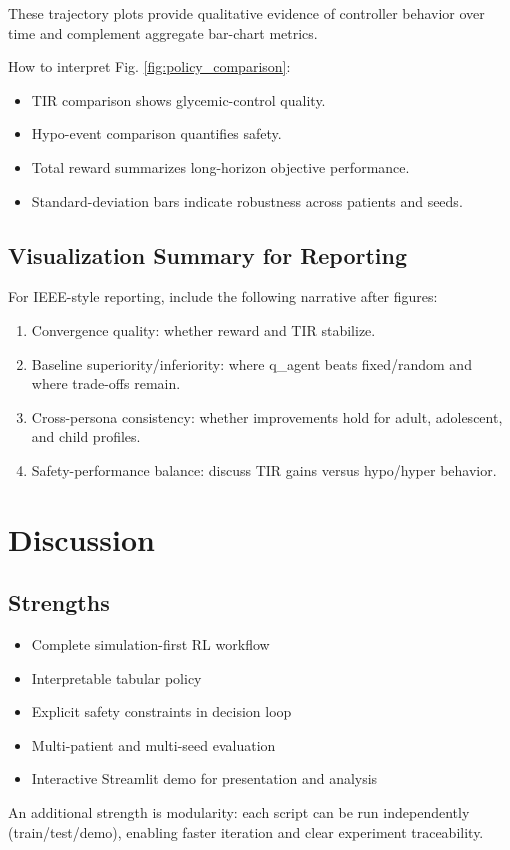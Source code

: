 \documentclass[conference]{IEEEtran}
\begin{document}
These trajectory plots provide qualitative evidence of controller behavior over time and complement aggregate bar-chart metrics.

How to interpret Fig. \ref{fig:policy_comparison}:
\begin{itemize}
    \item TIR comparison shows glycemic-control quality.
    \item Hypo-event comparison quantifies safety.
    \item Total reward summarizes long-horizon objective performance.
    \item Standard-deviation bars indicate robustness across patients and seeds.
\end{itemize}

\subsection{Visualization Summary for Reporting}
For IEEE-style reporting, include the following narrative after figures:
\begin{enumerate}
    \item Convergence quality: whether reward and TIR stabilize.
    \item Baseline superiority/inferiority: where q\_agent beats fixed/random and where trade-offs remain.
    \item Cross-persona consistency: whether improvements hold for adult, adolescent, and child profiles.
    \item Safety-performance balance: discuss TIR gains versus hypo/hyper behavior.
\end{enumerate}

\section{Discussion}
\subsection{Strengths}
\begin{itemize}
    \item Complete simulation-first RL workflow
    \item Interpretable tabular policy
    \item Explicit safety constraints in decision loop
    \item Multi-patient and multi-seed evaluation
    \item Interactive Streamlit demo for presentation and analysis
\end{itemize}
An additional strength is modularity: each script can be run independently (train/test/demo), enabling faster iteration and clear experiment traceability.
\end{document}
